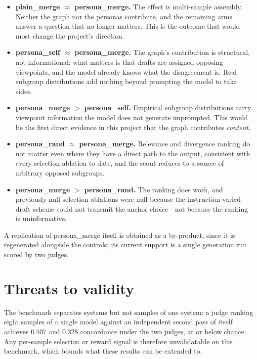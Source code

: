 \documentclass[11pt]{article}
\theoremstyle{definition}
\begin{document}
\begin{itemize}
\item \textbf{plain\_merge $\approx$ persona\_merge.} The effect is multi-sample
assembly. Neither the graph nor the personas contribute, and the remaining arms
answer a question that no longer matters. This is the outcome that would most
change the project's direction.

\item \textbf{persona\_self $\approx$ persona\_merge.} The graph's contribution
is structural, not informational: what matters is that drafts are assigned
opposing viewpoints, and the model already knows what the disagreement is. Real
subgroup distributions add nothing beyond prompting the model to take sides.

\item \textbf{persona\_merge $>$ persona\_self.} Empirical subgroup
distributions carry viewpoint information the model does not generate
unprompted. This would be the first direct evidence in this project that the
graph contributes \emph{content}.

\item \textbf{persona\_rand $\approx$ persona\_merge.} Relevance and divergence
ranking do not matter even where they have a direct path to the output,
consistent with every selection ablation to date, and the scout reduces to a
source of arbitrary opposed subgroups.

\item \textbf{persona\_merge $>$ persona\_rand.} The ranking does work, and
previously null selection ablations were null because the instruction-varied
draft scheme could not transmit the anchor choice---not because the ranking is
uninformative.
\end{itemize}

A replication of persona\_merge itself is obtained as a by-product, since it is
regenerated alongside the controls; its current support is a single generation
run scored by two judges.

\section{Threats to validity}

The benchmark separates systems but not samples of one system: a judge ranking
eight samples of a single model against an independent second pass of itself
achieves $0.507$ and $0.328$ concordance under the two judges, at or below
chance. Any per-sample selection or reward signal is therefore unvalidatable on
this benchmark, which bounds what these results can be extended to.
\end{document}
